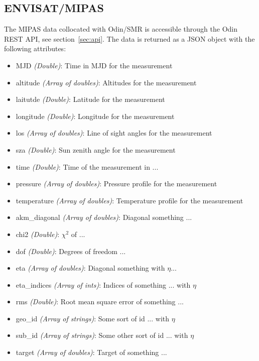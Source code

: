 \subsection{ENVISAT/MIPAS}
The MIPAS data collocated with Odin/SMR is accessible through the Odin REST
API, see section~\ref{sec:api}. The data is returned as a JSON object with the
following attributes:
\begin{itemize}
    \item MJD \emph{(Double)}: Time in MJD for the measurement
    \item altitude \emph{(Array of doubles)}: Altitudes for the measurement
    \item laitutde \emph{(Double)}: Latitude for the measurement
    \item longitude \emph{(Double)}: Longitude for the measurement
    \item los \emph{(Array of doubles)}: Line of sight angles for the
        measurement
    \item sza \emph{(Double)}: Sun zenith angle for the measurement
    \item time \emph{(Double)}: Time of the measurement in ... 
    \item pressure \emph{(Array of doubles)}: Pressure profile for the
        measurement
    \item temperature \emph{(Array of doubles)}: Temperature profile for the
        measurement
    \item akm\_diagonal \emph{(Array of doubles)}: Diagonal something ...
    \item chi2 \emph{(Double)}: $\chi^2$ of ... 
    \item dof \emph{(Double)}: Degrees of freedom ... 
    \item eta \emph{(Array of doubles)}: Diagonal something with $\eta$...
    \item eta\_indices \emph{(Array of ints)}: Indices of something ...
         with $\eta$
    \item rms \emph{(Double)}: Root mean square error of something ...
    \item geo\_id \emph{(Array of strings)}: Some sort of id ...
         with $\eta$
    \item sub\_id \emph{(Array of strings)}: Some other sort of id ...
         with $\eta$
    \item target \emph{(Array of doubles)}: Target of something ...

\end{itemize}
